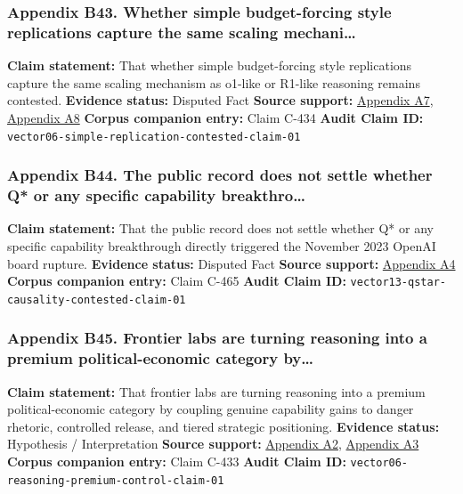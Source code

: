 \documentclass[
  american,
  11pt,
  letterpaper,
]{article}
\begin{document}
\subsubsection{Appendix B43. Whether simple budget-forcing style
replications capture the same scaling
mechani\ldots{}}\label{ch-06-appendix-b43-whether-simple-budget-forcing-style-replications-capture-the-same-scaling-mechani}

\textbf{Claim statement:} That whether simple budget-forcing style
replications capture the same scaling mechanism as o1-like or R1-like
reasoning remains contested. \textbf{Evidence status:} Disputed Fact
\textbf{Source support:}
\hyperref[ch-06-appendix-a7-s1-simple-test-time-scaling]{Appendix A7},
\hyperref[ch-06-appendix-a8-it-s-not-that-simple-an-analysis-of-simple-test-time-scaling]{Appendix
A8} \textbf{Corpus companion entry:} Claim C-434 \textbf{Audit Claim
ID:} \texttt{vector06-simple-replication-contested-claim-01}

\subsubsection{Appendix B44. The public record does not settle whether
Q* or any specific capability
breakthro\ldots{}}\label{ch-06-appendix-b44-the-public-record-does-not-settle-whether-q-or-any-specific-capability-breakthro}

\textbf{Claim statement:} That the public record does not settle whether
Q* or any specific capability breakthrough directly triggered the
November 2023 OpenAI board rupture. \textbf{Evidence status:} Disputed
Fact \textbf{Source support:}
\hyperref[ch-06-appendix-a4-openai-researchers-warned-board-of-ai-breakthrough-ahead-of-ceo-ouster-sources-say]{Appendix
A4} \textbf{Corpus companion entry:} Claim C-465 \textbf{Audit Claim
ID:} \texttt{vector13-qstar-causality-contested-claim-01}

\subsubsection{Appendix B45. Frontier labs are turning reasoning into a
premium political-economic category
by\ldots{}}\label{ch-06-appendix-b45-frontier-labs-are-turning-reasoning-into-a-premium-political-economic-category-by}

\textbf{Claim statement:} That frontier labs are turning reasoning into
a premium political-economic category by coupling genuine capability
gains to danger rhetoric, controlled release, and tiered strategic
positioning. \textbf{Evidence status:} Hypothesis / Interpretation
\textbf{Source support:}
\hyperref[ch-06-appendix-a2-openai-o1-system-card]{Appendix A2},
\hyperref[ch-06-appendix-a3-openai-acknowledges-new-models-increase-risk-of-misuse-to-create-bioweapons]{Appendix
A3} \textbf{Corpus companion entry:} Claim C-433 \textbf{Audit Claim
ID:} \texttt{vector06-reasoning-premium-control-claim-01}
\end{document}
